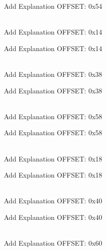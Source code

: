 \begin{DoxyRefList}
\label{todo__todo000112}%
%
Add Explanation OFFSET\+: 0x54  
\item[{\parbox[t]{\linewidth}{Member \doxylink{struct_r_c_c___reg_def__t_a4d9417933c32a335cd3a37bdfb808ebf}{RCC\+\_\+\+Reg\+Def\+\_\+t\+::AHB2\+RSTR} }}]\hfill \\
\label{todo__todo000026}%
%
Add Explanation OFFSET\+: 0x14 

\label{todo__todo000096}%
%
Add Explanation OFFSET\+: 0x14  
\item[{\parbox[t]{\linewidth}{Member \doxylink{struct_r_c_c___reg_def__t_a169af9918bc0814f05c418f3415dc076}{RCC\+\_\+\+Reg\+Def\+\_\+t\+::AHB3\+ENR} }}]\hfill \\
\label{todo__todo000035}%
%
Add Explanation OFFSET\+: 0x38 

\label{todo__todo000105}%
%
Add Explanation OFFSET\+: 0x38  
\item[{\parbox[t]{\linewidth}{Member \doxylink{struct_r_c_c___reg_def__t_a969f867be521a744da3424fca2bbc135}{RCC\+\_\+\+Reg\+Def\+\_\+t\+::AHB3\+LPENR} }}]\hfill \\
\label{todo__todo000043}%
%
Add Explanation OFFSET\+: 0x58 

\label{todo__todo000113}%
%
Add Explanation OFFSET\+: 0x58  
\item[{\parbox[t]{\linewidth}{Member \doxylink{struct_r_c_c___reg_def__t_a1615f7058bdbf041034f173b95f48932}{RCC\+\_\+\+Reg\+Def\+\_\+t\+::AHB3\+RSTR} }}]\hfill \\
\label{todo__todo000027}%
%
Add Explanation OFFSET\+: 0x18 

\label{todo__todo000097}%
%
Add Explanation OFFSET\+: 0x18  
\item[{\parbox[t]{\linewidth}{Member \doxylink{struct_r_c_c___reg_def__t_a389643cd117089ebb8dd10ec060488d8}{RCC\+\_\+\+Reg\+Def\+\_\+t\+::APB1\+ENR} }}]\hfill \\
\label{todo__todo000037}%
%
Add Explanation OFFSET\+: 0x40 

\label{todo__todo000107}%
%
Add Explanation OFFSET\+: 0x40  
\item[{\parbox[t]{\linewidth}{Member \doxylink{struct_r_c_c___reg_def__t_af3e9349611ac0807a4b8ad3b9092490a}{RCC\+\_\+\+Reg\+Def\+\_\+t\+::APB1\+LPENR} }}]\hfill \\
\label{todo__todo000045}%
%
Add Explanation OFFSET\+: 0x60 


\end{DoxyRefList}
